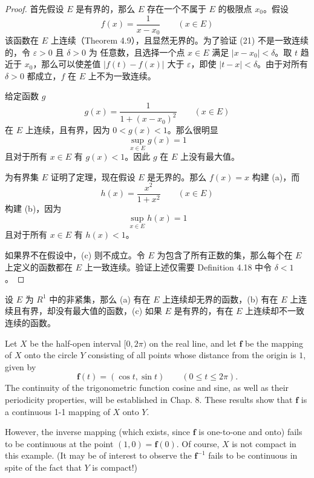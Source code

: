 \documentclass[../poma-notes.tex]{subfiles}
\begin{document}
\begin{proof}
  首先假设 $E$ 是有界的，那么 $E$ 存在一个不属于 $E$ 的极限点 $x_0$。假设
  \begin{equation}
    f(x) = \frac{1}{x - x_0} \qquad (x \in E)
  \end{equation}
  该函数在 $E$ 上连续（Theorem 4.9），且显然无界的。为了验证 (21) 不是一致连续的，令 $\varepsilon > 0$ 且 $\delta >0$ 为
  任意数，且选择一个点 $x \in E$ 满足 $|x - x_0| < \delta$。取 $t$ 趋近于 $x_0$，那么可以使差值 $|f(t) - f(x)|$ 大于
  $\varepsilon$，即使 $|t - x| < \delta$。由于对所有 $\delta > 0$ 都成立，$f$ 在 $E$ 上不为一致连续。

  给定函数 $g$
  \begin{equation}
    g(x) = \frac{1}{1+(x-x_0)^2} \qquad (x \in E)
  \end{equation}
  在 $E$ 上连续，且有界，因为 $0 < g(x) < 1$。那么很明显
  \[
    \sup_{x \in E} g(x) = 1
  \]
  且对于所有 $x \in E$ 有 $g(x) < 1$。因此 $g$ 在 $E$ 上没有最大值。

  为有界集 $E$ 证明了定理，现在假设 $E$ 是无界的。那么 $f(x) = x$ 构建 (a)，而
  \begin{equation}
    h(x) = \frac{x^2}{1+x^2} \qquad (x \in E)
  \end{equation}
  构建 (b)，因为
  \[
    \sup_{x \in E} h(x) = 1
  \]
  且对于所有 $x \in E$ 有 $h(x) < 1$。

  如果界不在假设中，(c) 则不成立。令 $E$ 为包含了所有正数的集，那么每个在 $E$ 上定义的函数都在 $E$ 上一致连续。验证上述仅需要
  Definition 4.18 中令 $\delta < 1$。
\end{proof}

\begin{anote}
  设 $E$ 为 $R^1$ 中的非紧集，那么 (a) 有在 $E$ 上连续却无界的函数，(b) 有在 $E$ 上连续且有界，却没有最大值的函数，(c) 如果
  $E$ 是有界的，有在 $E$ 上连续却不一致连续的函数。
\end{anote}

\begin{example}
  Let $X$ be the half-open interval $[0, 2\pi)$ on the real line, and let $\mathbf{f}$ be the mapping of $X$ onto
  the circle $Y$ consisting of all points whose distance from the origin is $1$, given by
  \begin{equation}
    \mathbf{f}(t) = (\cos t, \sin t) \qquad (0 \le t \le 2\pi).
  \end{equation}
  The continuity of the trigonometric function cosine and sine, as well as their periodicity properties, will be
  established in Chap. 8. These results show that $\mathbf{f}$ is a continuous 1-1 mapping of $X$ onto $Y$.

  However, the inverse mapping (which exists, since $\mathbf{f}$ is one-to-one and onto) fails to be continuous
  at the point $(1, 0) = \mathbf{f}(0)$. Of course, $X$ is not compact in this example. (It may be of interest to
  observe the $\mathbf{f}^{-1}$ fails to be continuous in spite of the fact that $Y$ is compact!)
\end{example}
\end{document}
